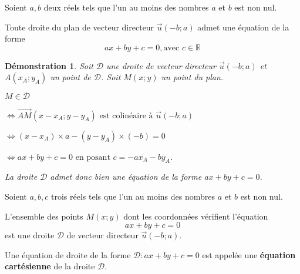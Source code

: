 \documentclass[a4paper,11pt]{article}
\theoremstyle{break}
\newcounter{enonce}
\newtheorem{demonstration}[enonce]{Démonstration}
\begin{document}
   
     \begin{theorem}

    Soient $a,b$ deux réels tels que l'un au moins des nombres $a$ et $b$ est non nul.
    
    Toute droite du plan de vecteur directeur $\vec{u}(-b;a)$ admet une équation de la forme 
    $$ax+by+c=0, \textrm{avec $c \in \mathbb{R}$}$$
       
   \end{theorem}
   
   \begin{demonstration}
    
    Soit $\mathcal{D}$ une droite de vecteur directeur $\vec{u}(-b;a)$ et $A(x_A;y_A)$ un point de 
    $\mathcal{D}$. Soit $M(x;y)$ un point du plan.
    
    $M \in \mathcal{D}$
    
    $\iff {\vec{AM}}({x-x_A};{y-y_A}) 
    \textrm{ est colinéaire à } {\vec{u}(-b;a)}$
    
    $\iff (x-x_A)\times {a} -{(y-y_A)} \times (-b)=0$ 
    
    $\iff ax+by+c=0 \textrm{ en posant }c={-ax_A-by_A}$.
    
    La droite $\mathcal{D}$ admet donc bien une équation de la forme $ax+by+c=0$.
   \end{demonstration}
   
    \begin{theorem}

    Soient $a,b,c$ trois réels tels que l'un au moins des nombres $a$ et $b$ est non nul.
    
    L'ensemble des points $M(x;y)$ dont les coordonnées vérifient l'équation
    $$ax+by+c=0$$ est une droite $\mathcal{D}$ de vecteur directeur $\vec{u}{(-b;a)}$.
    
  
   
   \end{theorem}
   
   \begin{definition}
   
   Une équation de droite de la forme $\mathcal{D}:ax+by+c=0$ est appelée une \textbf{équation cartésienne} de la droite $\mathcal{D}$.
   \end{definition}
   
\end{document}
